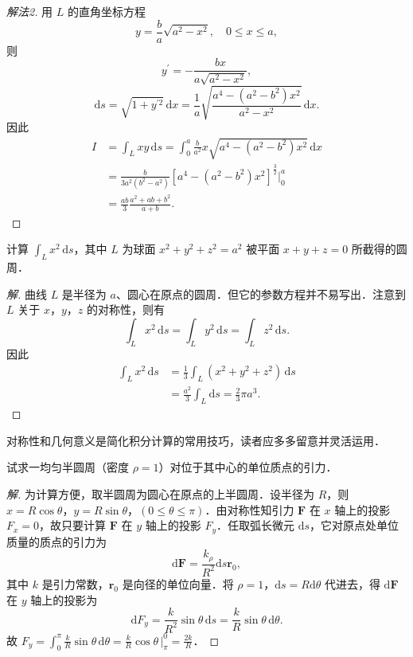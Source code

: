 \begin{proof}[解法2]
用 $L$ 的直角坐标方程
\[
y=\frac{b}{a}\sqrt{a^{2}-x^{2}},\quad 0\leqslant x\leqslant a,
\]
则
\[
y^{\prime}=-\frac{bx}{a\sqrt{a^{2}-x^{2}}},
\]
\[
\mathrm{d}s=\sqrt{1+y^{\prime2}}\,\mathrm{d}x=\frac{1}{a}\sqrt{\frac{a^{4}-(a^{2}-b^{2})x^{2}}{a^{2}-x^{2}}}\,\mathrm{d}x.
\]
因此
\[
\begin{aligned}
I&=\int_{L}xy\,\mathrm{d}s=\int_{0}^{a}\frac{b}{a^{2}}x\sqrt{a^{4}-(a^{2}-b^{2})x^{2}}\,\mathrm{d}x\\
&=\frac{b}{3a^{2}(b^{2}-a^{2})}\left[a^{4}-(a^{2}-b^{2})x^{2}\right]^{\frac{3}{2}}\bigg|_{0}^{a}\\
&=\frac{ab}{3}\frac{a^{2}+ab+b^{2}}{a+b}.
\end{aligned}
\]
\end{proof}

\begin{example}\label{ex:21-1-2}
计算 $\displaystyle\int_{L}x^{2}\,\mathrm{d}s$，其中 $L$ 为球面 $x^{2}+y^{2}+z^{2}=a^{2}$ 被平面 $x+y+z=0$ 所截得的圆周．
\end{example}

\begin{proof}[解]
曲线 $L$ 是半径为 $a$、圆心在原点的圆周．但它的参数方程并不易写出．注意到 $L$ 关于 $x$，$y$，$z$ 的对称性，则有
\[
\int_{L}x^{2}\,\mathrm{d}s=\int_{L}y^{2}\,\mathrm{d}s=\int_{L}z^{2}\,\mathrm{d}s.
\]
因此
\[
\begin{aligned}
\int_{L}x^{2}\,\mathrm{d}s&=\frac{1}{3}\int_{L}(x^{2}+y^{2}+z^{2})\,\mathrm{d}s\\
&=\frac{a^{2}}{3}\int_{L}\mathrm{d}s=\frac{2}{3}\pi a^{3}.
\end{aligned}
\]
\end{proof}

对称性和几何意义是简化积分计算的常用技巧，读者应多多留意并灵活运用．

\begin{example}\label{ex:21-1-3}
试求一均匀半圆周（密度 $\rho=1$）对位于其中心的单位质点的引力．
\end{example}

\begin{proof}[解]
为计算方便，取半圆周为圆心在原点的上半圆周．设半径为 $R$，则 $x=R\cos\theta$，$y=R\sin\theta$，$(0\leqslant\theta\leqslant\pi)$．由对称性知引力 $\bm{F}$ 在 $x$ 轴上的投影 $F_{x}=0$，故只要计算 $\bm{F}$ 在 $y$ 轴上的投影 $F_{y}$．任取弧长微元 $\mathrm{d}s$，它对原点处单位质量的质点的引力为
\[
\mathrm{d}\bm{F}=\frac{k_{\rho}}{R^{2}}\mathrm{d}s\bm{r}_{0},
\]
其中 $k$ 是引力常数，$\bm{r}_{0}$ 是向径的单位向量．将 $\rho=1$，$\mathrm{d}s=R\mathrm{d}\theta$ 代进去，得 $\mathrm{d}\bm{F}$ 在 $y$ 轴上的投影为
\[
\mathrm{d}F_{y}=\frac{k}{R^{2}}\sin\theta\,\mathrm{d}s=\frac{k}{R}\sin\theta\,\mathrm{d}\theta.
\]
故 $F_{y}=\displaystyle\int_{0}^{\pi}\frac{k}{R}\sin\theta\,\mathrm{d}\theta=\frac{k}{R}\cos\theta\,\bigg|_{\pi}^{0}=\frac{2k}{R}$．
\end{proof}

